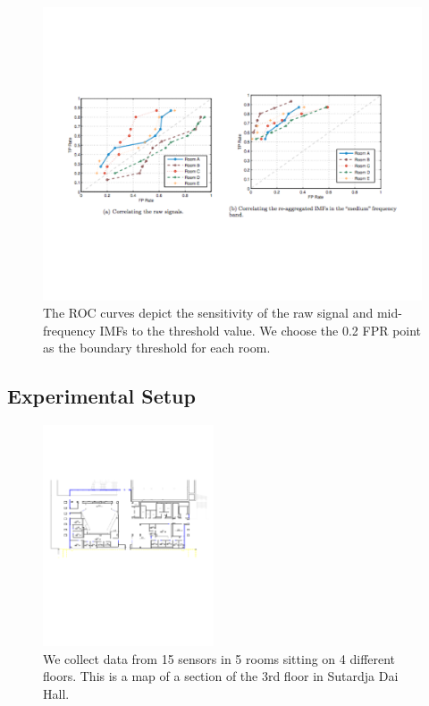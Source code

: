 \begin{figure}[ht!]
\centering
	 \includegraphics[width=1.00\textwidth]{figs/ROCgraphs}
\caption{The ROC curves depict the sensitivity of the raw signal and mid-frequency IMFs to the threshold value. We choose the 0.2 FPR point as the boundary threshold for each room. }
\label{fig:roc}
\end{figure}



\subsection{Experimental Setup}
\begin{figure}[h!]
\centering
  \includegraphics[width=0.45\textwidth]{figs/SDH3_crop}
\caption{We collect data from 15 sensors in 5 rooms sitting on 4 different floors. This is a map of a section of the 3rd floor
in Sutardja Dai Hall.}
\label{fig:sdh}
\end{figure}

